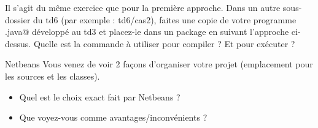 \documentclass[a4paper,11pt]{article}
\begin{document}
		\begin{Exercice}{}
				Il s'agit du m\^eme exercice que pour la premi\`ere approche.
				Dans un autre sous-dossier du td6 (par exemple : td6/cas2),
				faites une copie de votre programme \verb@Hello.java@ d\'evelopp\'e au td3
				et placez-le dans un package en suivant l'approche ci-dessus.
				Quelle est la commande \`a utiliser pour compiler ?
				Et pour ex\'ecuter ?
		\end{Exercice}
			
            \par
        
		\par\medskip 
				
	\begin{Exercice}{Netbeans}
	Vous venez de voir 2 façons d'organiser votre projet (emplacement pour les sources et les classes). 
		\begin{itemize}
			\item Quel est le choix exact fait par Netbeans ? 
			\item Que voyez-vous comme avantages/inconvénients ?
		\end{itemize}
	\end{Exercice}		
\end{document}
